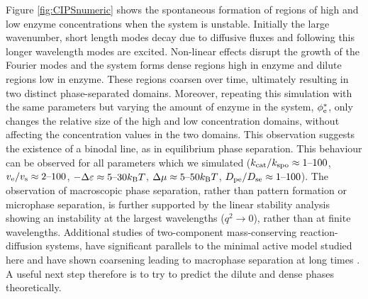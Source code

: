 Figure \ref{fig:CIPSnumeric} shows the spontaneous formation of regions of high and low enzyme concentrations when the system is unstable. Initially the large wavenumber, short length modes decay due to diffusive fluxes and following this longer wavelength modes are excited. Non-linear effects disrupt the growth of the Fourier modes and the system forms dense regions high in enzyme and dilute regions low in enzyme. These regions coarsen over time, ultimately resulting in two distinct phase-separated domains. Moreover, repeating this simulation with the same parameters but varying the amount of enzyme in the system, $\phi_{\mathrm{e}}^*$, only changes the relative size of the high and low concentration domains, without affecting the concentration values in the two domains. This observation suggests the existence of a binodal line, as in equilibrium phase separation. This behaviour can be observed for all parameters which we simulated ($k_{\mathrm{cat}}/k_{\mathrm{spo}}\approx 1 \text{--} 100$, $v_{\mathrm{e}}/v_{\mathrm{s}}\approx 2 \text{--} 100$, $-\Delta \varepsilon\approx 5 \text{--} 30 k_{\rm B} T$, $\Delta \mu\approx5 \text{--} 50k_{\rm B} T$,  $D_{\mathrm{pe}}/D_{\mathrm{se}}\approx1 \text{--} 100$). The observation of macroscopic phase separation, rather than pattern formation or microphase separation, is further supported by the linear stability analysis showing an instability at the largest wavelengths ($q^2 \to 0$), rather than at finite wavelengths. Additional studies of two-component mass-conserving reaction-diffusion systems, have significant parallels to the minimal active model studied here and have shown coarsening leading to macrophase separation at long times \cite{brauns_phase-space_2020, brauns_wavelength_2021}.  A useful next step therefore is to try to predict the dilute and dense phases theoretically.
